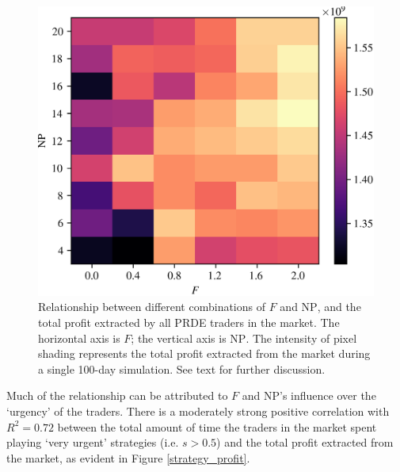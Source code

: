 \documentclass[conference]{IEEEtran}
\begin{document}
\begin{figure}[htbp]
    \centerline{\includegraphics[width=\columnwidth]{profit_grid.png}}
    \caption{
        Relationship between different combinations of $F$ and $\mathrm{NP}$, and the total profit extracted by all PRDE traders in the market.
        The horizontal axis is $F$; the vertical axis is $\mathrm{NP}$.
        The intensity of pixel shading represents the total profit extracted from the market during a single 100-day simulation.
        See text for further discussion.
    }
    \label{profit_grid}
\end{figure}

Much of the relationship can be attributed to $F$ and $\mathrm{NP}$'s influence over the `urgency' of the traders.
There is a moderately strong positive correlation with $R^2=0.72$ between the total amount of time the traders in the market spent playing `very urgent' strategies (i.e. $s>0.5$) and the total profit extracted from the market, as evident in Figure \ref{strategy_profit}.
\end{document}
